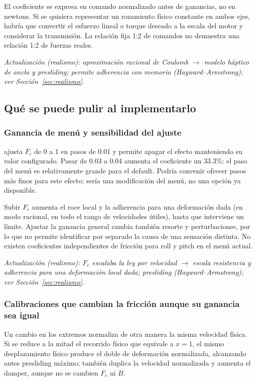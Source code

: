 \documentclass[11pt,a4paper]{article}
\newcommand{\code}[1]{\texttt{\detokenize{#1}}}
\begin{document}
El coeficiente se expresa en comando normalizado antes de ganancias, no en newtons. Si se quisiera representar un rozamiento físico constante en ambos ejes, habría que convertir el esfuerzo lineal o torque deseado a la escala del motor y considerar la transmisión. La relación fija 1:2 de comandos no demuestra una relación 1:2 de fuerzas reales.

\textit{Actualización (realismo): aproximación racional de Coulomb $\rightarrow$ modelo háptico de ancla y presliding; permite adherencia con memoria (Hayward--Armstrong); ver Sección~\ref{sec:realismo}.}

\subsection{Qué se puede pulir al implementarlo}
\subsubsection{Ganancia de menú y sensibilidad del ajuste}
\code{Friccion} ajusta $F_c$ de 0 a 1 en pasos de 0.01 y permite apagar el efecto manteniendo su valor configurado. Pasar de 0.03 a 0.04 aumenta el coeficiente un $33.3\%$: el paso del menú es relativamente grande para el default. Podría convenir ofrecer pasos más finos para este efecto; sería una modificación del menú, no una opción ya disponible.

Subir $F_c$ aumenta el roce local y la adherencia para una deformación dada (en modo racional, en todo el rango de velocidades útiles), hasta que interviene un límite. Ajustar la ganancia general cambia también resorte y perturbaciones, por lo que no permite identificar por separado la causa de una sensación distinta. No existen coeficientes independientes de fricción para roll y pitch en el menú actual.

\textit{Actualización (realismo): $F_c$ escalaba la ley por velocidad $\rightarrow$ escala resistencia y adherencia para una deformación local dada; presliding (Hayward--Armstrong); ver Sección~\ref{sec:realismo}.}

\subsubsection{Calibraciones que cambian la fricción aunque su ganancia sea igual}
Un cambio en los extremos normaliza de otra manera la misma velocidad física. Si se reduce a la mitad el recorrido físico que equivale a $x=1$, el mismo desplazamiento físico produce el doble de deformación normalizada, alcanzando antes presliding máximo; también duplica la velocidad normalizada y aumenta el damper, aunque no se cambien $F_c$ ni $B$.
\end{document}
